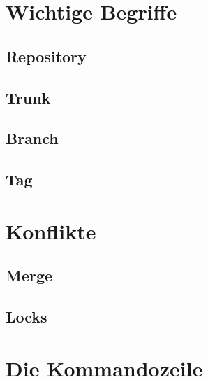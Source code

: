 \section{Wichtige Begriffe}
\subsection{Repository}
\subsection{Trunk}
\subsection{Branch}
\subsection{Tag}

\section{Konflikte}
\subsection{Merge}
\subsection{Locks}

\section{Die Kommandozeile}
